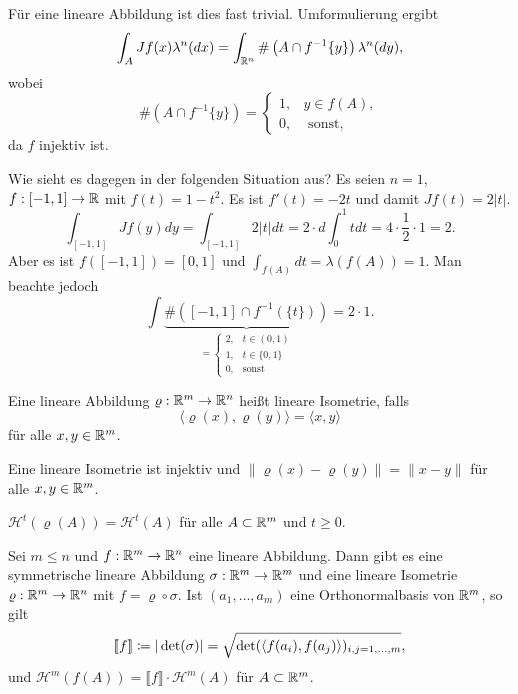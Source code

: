 \documentclass[a4paper,twoside,DIV15,BCOR12mm]{scrbook}
\newcommand{\HM}{\mathscr H}
\begin{document}
Für eine lineare Abbildung ist dies fast trivial. Umformulierung ergibt
\[
\int_A Jf(x)\lambda^n(dx)=\int_{\mathbb{R}^n}\#\left(A\cap f^{-1}\{y\}\right)\lambda^n(dy),
\]
wobei
$$
\#\left(A\cap f^{-1}\{y\}\right)=\begin{cases} 1,&y\in f(A),\\0,&\text{ sonst}, 
\end{cases}
$$
da $f$ injektiv ist.

\begin{beispiel}
Wie sieht es dagegen in der folgenden Situation aus?
Es seien $n=1$, $f:[-1,1]\to\mathbb{R}$ mit $f(t) = 1-t^2$. Es ist $f'(t) = -2t$ und damit $Jf(t)=2|t|$.
\[
\int_{[-1,1]}Jf(y) dy = \int_{[-1,1]} 2|t|dt = 2 \cdot d\int_0^1 tdt = 4 \cdot \frac12 \cdot 1 = 2.
\]
Aber es ist $f([-1,1]) = [0,1]$ und $\int_{f(A)}dt = \lambda(f(A)) = 1$. Man beachte jedoch
\[
\int \underbrace{\#( [-1,1] \cap f^{-1}(\{t\}))}_{
=\begin{cases}
2, & t\in(0,1) \\
1, & t\in\{0,1\} \\
0, & \text{sonst}
\end{cases}
}=  2\cdot 1.
\]
\end{beispiel}

\begin{definition}
Eine lineare Abbildung $\varrho: \mathbb{R}^m \to \mathbb{R}^n$ heißt lineare Isometrie, falls
\[
\langle \varrho(x), \varrho(y) \rangle = \langle x,y \rangle
\]
für alle $x,y\in\mathbb{R}^m$.
\end{definition}

\begin{bemerkungen}
\item Eine lineare Isometrie ist injektiv und $\|\varrho(x) - \varrho(y)\| = \|x-y\|$ für alle $x,y\in\mathbb{R}^m$.
\item $\HM^t(\varrho(A)) = \HM^t(A)$ für alle $A\subset \mathbb{R}^m$ und $t\ge 0$.
\end{bemerkungen}

\begin{lemma}
\label{lem:3.4}
Sei $m\le n$ und $f:\mathbb{R}^m \to \mathbb{R}^n$ eine lineare Abbildung. Dann gibt es eine symmetrische lineare Abbildung $\sigma: \mathbb{R}^m\to\mathbb{R}^m$ und eine lineare Isometrie $\varrho:\mathbb{R}^m\to\mathbb{R}^n$ mit $f =\varrho \circ \sigma$. Ist $(a_1,\ldots,a_m)$ eine Orthonormalbasis von $\mathbb{R}^m$, so gilt
\[
\llbracket f \rrbracket \da |\det(\sigma)| = \sqrt{ \det(\langle f(a_i),f(a_j)\rangle)_{i,j=1,\ldots,m}},
\]
und $\HM^m(f(A)) = \llbracket f \rrbracket \cdot \HM^m(A)$ für $A\subset \mathbb{R}^m$.
\end{lemma}
\end{document}
